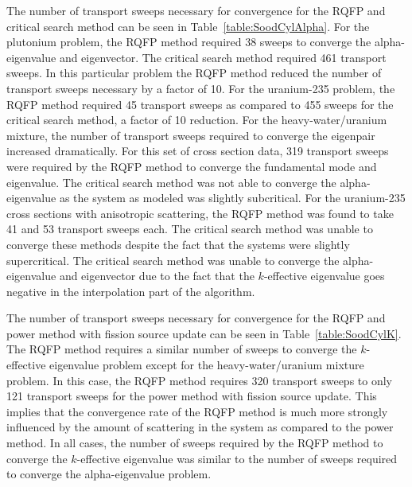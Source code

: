 The number of transport sweeps necessary for convergence for the RQFP and critical search method can be seen in Table~\ref{table:SoodCylAlpha}. For the plutonium problem, the RQFP method required 38 sweeps to converge the alpha-eigenvalue and eigenvector. The critical search method required 461 transport sweeps. In this particular problem the RQFP method reduced the number of transport sweeps necessary by a factor of 10. For the uranium-235 problem, the RQFP method required 45 transport sweeps as compared to 455 sweeps for the critical search method, a factor of 10 reduction. For the heavy-water/uranium mixture, the number of transport sweeps required to converge the eigenpair increased dramatically. For this set of cross section data, 319 transport sweeps were required by the RQFP method to converge the fundamental mode and eigenvalue. The critical search method was not able to converge the alpha-eigenvalue as the system as modeled was slightly subcritical. For the uranium-235 cross sections with anisotropic scattering, the RQFP method was found to take 41 and 53 transport sweeps each. The critical search method was unable to converge these methods despite the fact that the systems were slightly supercritical. The critical search method was unable to converge the alpha-eigenvalue and eigenvector due to the fact that the $k$-effective eigenvalue goes negative in the interpolation part of the algorithm.

The number of transport sweeps necessary for convergence for the RQFP and power method with fission source update can be seen in Table~\ref{table:SoodCylK}. The RQFP method requires a similar number of sweeps to converge the $k$-effective eigenvalue problem except for the heavy-water/uranium mixture problem. In this case, the RQFP method requires 320 transport sweeps to only 121 transport sweeps for the power method with fission source update. This implies that the convergence rate of the RQFP method is much more strongly influenced by the amount of scattering in the system as compared to the power method. In all cases, the number of sweeps required by the RQFP method to converge the $k$-effective eigenvalue was similar to the number of sweeps required to converge the alpha-eigenvalue problem. 


